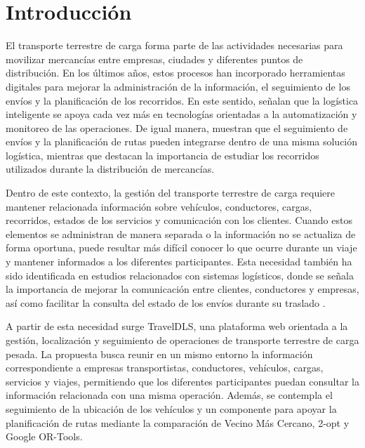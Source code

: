 

\section{Introducción}
\label{sec:introduccion}

El transporte terrestre de carga forma parte de las actividades necesarias para movilizar mercancías entre empresas, ciudades y diferentes puntos de distribución. En los últimos años, estos procesos han incorporado herramientas digitales para mejorar la administración de la información, el seguimiento de los envíos y la planificación de los recorridos. En este sentido, \textcite{kalkha2023rising} señalan que la logística inteligente se apoya cada vez más en tecnologías orientadas a la automatización y monitoreo de las operaciones. De igual manera, \textcite{zhang2024ecommerce} muestran que el seguimiento de envíos y la planificación de rutas pueden integrarse dentro de una misma solución logística, mientras que \textcite{xin2022logistics} destacan la importancia de estudiar los recorridos utilizados durante la distribución de mercancías.

Dentro de este contexto, la gestión del transporte terrestre de carga requiere mantener relacionada información sobre vehículos, conductores, cargas, recorridos, estados de los servicios y comunicación con los clientes. Cuando estos elementos se administran de manera separada o la información no se actualiza de forma oportuna, puede resultar más difícil conocer lo que ocurre durante un viaje y mantener informados a los diferentes participantes. Esta necesidad también ha sido identificada en estudios relacionados con sistemas logísticos, donde se señala la importancia de mejorar la comunicación entre clientes, conductores y empresas, así como facilitar la consulta del estado de los envíos durante su traslado \parencite{sultan2022real}.

A partir de esta necesidad surge TravelDLS, una plataforma web orientada a la gestión, localización y seguimiento de operaciones de transporte terrestre de carga pesada. La propuesta busca reunir en un mismo entorno la información correspondiente a empresas transportistas, conductores, vehículos, cargas, servicios y viajes, permitiendo que los diferentes participantes puedan consultar la información relacionada con una misma operación. Además, se contempla el seguimiento de la ubicación de los vehículos y un componente para apoyar la planificación de rutas mediante la comparación de Vecino Más Cercano, 2-opt y Google OR-Tools.

